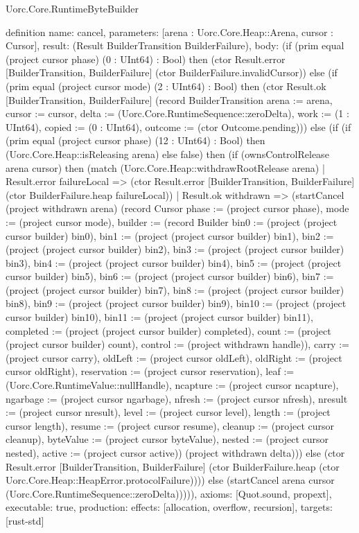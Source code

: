 \begin{lexlean}{Uorc.Core.RuntimeByteBuilder}
\begin{semanticmodule}
definition{
  name: cancel,
  parameters: [arena : Uorc.Core.Heap::Arena, cursor : Cursor],
  result: (Result BuilderTransition BuilderFailure),
  body: (if (prim equal (project cursor phase) (0 : UInt64) : Bool) then (ctor Result.error [BuilderTransition, BuilderFailure] (ctor BuilderFailure.invalidCursor)) else (if (prim equal (project cursor mode) (2 : UInt64) : Bool) then (ctor Result.ok [BuilderTransition, BuilderFailure] (record BuilderTransition {arena := arena, cursor := cursor, delta := (Uorc.Core.RuntimeSequence::zeroDelta), work := (1 : UInt64), copied := (0 : UInt64), outcome := (ctor Outcome.pending)})) else (if (if (prim equal (project cursor phase) (12 : UInt64) : Bool) then (Uorc.Core.Heap::isReleasing arena) else false) then (if (ownsControlRelease arena cursor) then (match (Uorc.Core.Heap::withdrawRootRelease arena)
    | Result.error failureLocal => (ctor Result.error [BuilderTransition, BuilderFailure] (ctor BuilderFailure.heap failureLocal))
    | Result.ok withdrawn => (startCancel (project withdrawn arena) (record Cursor {phase := (project cursor phase), mode := (project cursor mode), builder := (record Builder {bin0 := (project (project cursor builder) bin0), bin1 := (project (project cursor builder) bin1), bin2 := (project (project cursor builder) bin2), bin3 := (project (project cursor builder) bin3), bin4 := (project (project cursor builder) bin4), bin5 := (project (project cursor builder) bin5), bin6 := (project (project cursor builder) bin6), bin7 := (project (project cursor builder) bin7), bin8 := (project (project cursor builder) bin8), bin9 := (project (project cursor builder) bin9), bin10 := (project (project cursor builder) bin10), bin11 := (project (project cursor builder) bin11), completed := (project (project cursor builder) completed), count := (project (project cursor builder) count), control := (project withdrawn handle)}), carry := (project cursor carry), oldLeft := (project cursor oldLeft), oldRight := (project cursor oldRight), reservation := (project cursor reservation), leaf := (Uorc.Core.RuntimeValue::nullHandle), ncapture := (project cursor ncapture), ngarbage := (project cursor ngarbage), nfresh := (project cursor nfresh), nresult := (project cursor nresult), level := (project cursor level), length := (project cursor length), resume := (project cursor resume), cleanup := (project cursor cleanup), byteValue := (project cursor byteValue), nested := (project cursor nested), active := (project cursor active)}) (project withdrawn delta))) else (ctor Result.error [BuilderTransition, BuilderFailure] (ctor BuilderFailure.heap (ctor Uorc.Core.Heap::HeapError.protocolFailure)))) else (startCancel arena cursor (Uorc.Core.RuntimeSequence::zeroDelta))))),
  axioms: [Quot.sound, propext],
  executable: true,
  production: {effects: [allocation, overflow, recursion], targets: [rust-std]}
}


\end{semanticmodule}
\end{lexlean}
